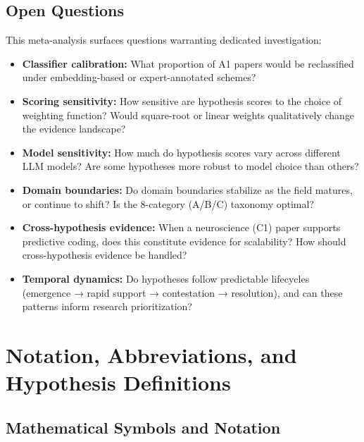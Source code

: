 \documentclass[
]{article}
\providecommand{\tightlist}{%
  \setlength{\itemsep}{0pt}\setlength{\parskip}{0pt}}
\begin{document}
\subsection{Open Questions}\label{open-questions}

This meta-analysis surfaces questions warranting dedicated
investigation:

\begin{itemize}
\tightlist
\item
  \textbf{Classifier calibration:} What proportion of A1 papers would be
  reclassified under embedding-based or expert-annotated schemes?
\item
  \textbf{Scoring sensitivity:} How sensitive are hypothesis scores to
  the choice of weighting function? Would square-root or linear weights
  qualitatively change the evidence landscape?
\item
  \textbf{Model sensitivity:} How much do hypothesis scores vary across
  different LLM models? Are some hypotheses more robust to model choice
  than others?
\item
  \textbf{Domain boundaries:} Do domain boundaries stabilize as the
  field matures, or continue to shift? Is the 8-category (A/B/C)
  taxonomy optimal?
\item
  \textbf{Cross-hypothesis evidence:} When a neuroscience (C1) paper
  supports predictive coding, does this constitute evidence for
  scalability? How should cross-hypothesis evidence be handled?
\item
  \textbf{Temporal dynamics:} Do hypotheses follow predictable
  lifecycles (emergence → rapid support → contestation → resolution),
  and can these patterns inform research prioritization?
\end{itemize}

\newpage

\section{Notation, Abbreviations, and Hypothesis
Definitions}\label{notation-abbreviations-and-hypothesis-definitions}

\subsection{Mathematical Symbols and
Notation}\label{mathematical-symbols-and-notation}
\end{document}
